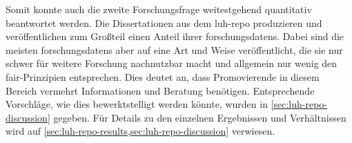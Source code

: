 Somit konnte auch die zweite Forschungsfrage weitestgehend quantitativ beantwortet werden.
Die Dissertationen aus dem \gls{luh-repo} produzieren und veröffentlichen zum Großteil einen Anteil ihrer \glspl{forschungsdaten}.
Dabei sind die meisten \glspl{forschungsdaten} aber auf eine Art und Weise veröffentlicht, die sie nur schwer für weitere Forschung nachnutzbar macht und allgemein nur wenig den \gls{fair}-Prinzipien entsprechen.
Dies deutet an, dass Promovierende in diesem Bereich vermehrt Informationen und Beratung benötigen.
Entsprechende Vorschläge, wie dies bewerktstelligt werden könnte, wurden in \cref{sec:luh-repo-discussion} gegeben.
Für Details zu den einzelnen Ergebnissen und Verhältnissen wird auf \cref{sec:luh-repo-results,sec:luh-repo-discussion} verwiesen.